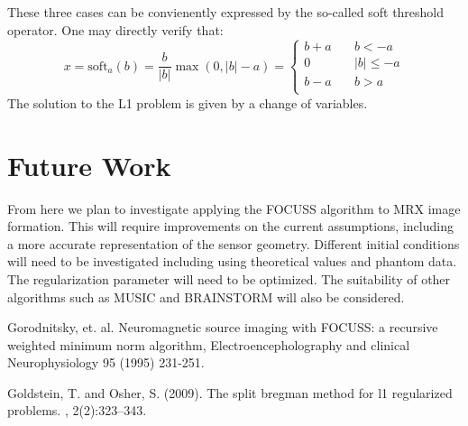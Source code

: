 \documentclass[a4paper]{article}
\begin{document}
These three cases can be convienently expressed by the so-called
soft threshold operator. One may directly verify that:
\[
x = \text{soft}_a(b) = \frac{b}{|b|} \max (0,|b|-a) 
  = 
  \left\{
   \begin{split}
      b+a  & \quad  b     < -a \\
       0   & \quad |b| \leq -a \\
      b-a  & \quad  b     >  a \\
   \end{split}
  \right.
\]
The solution to the L1 problem is given by a change of
variables.

\section{Future Work}

From here we plan to investigate applying the FOCUSS algorithm to MRX image formation.  This will require improvements on the current assumptions, including a more accurate representation of the sensor geometry.  Different initial conditions will need to be investigated including using theoretical values and phantom data.  The regularization parameter will need to be optimized. The suitability of other algorithms such as MUSIC and BRAINSTORM will also be considered.


\begin{thebibliography}{2}
 Gorodnitsky, et. al. Neuromagnetic source imaging with FOCUSS: a recursive weighted minimum norm algorithm, Electroencepholography and clinical Neurophysiology 95 (1995) 231-251.

Goldstein, T. and Osher, S. (2009).
\newblock The split bregman method for l1 regularized problems.
, 2(2):323--343.

\end{thebibliography}
\end{document}
